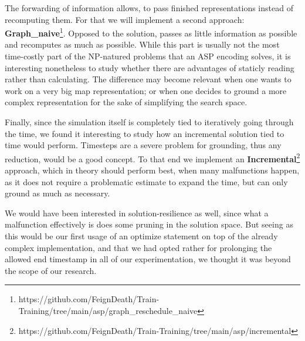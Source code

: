 The forwarding of information allows, to pass finished representations instead of recomputing them. For that we will implement a second approach: \textbf{Graph\_naive}\footnote{https://github.com/FeignDeath/Train-Training/tree/main/asp/graph\_reschedule\_naive}. Opposed to the solution, passes as little information as possible and recomputes as much as possible. While this part is usually not the most time-costly part of the NP-natured problems that an ASP encoding solves, it is interesting nonetheless to study whether there are advantages of staticly reading rather than calculating. The difference may become relevant when one wants to work on a very big map representation; or when one decides to ground a more complex representation for the sake of simplifying the search space.


Finally, since the simulation itself is completely tied to iteratively going through the time, we found it interesting to study how an incremental solution tied to time would perform. Timesteps are a severe problem for grounding, thus any reduction, would be a good concept. To that end we implement an \textbf{Incremental}\footnote{https://github.com/FeignDeath/Train-Training/tree/main/asp/incremental} approach, which in theory should perform best, when many malfunctions happen, as it does not require a problematic estimate to expand the time, but can only ground as much as necessary.


We would have been interested in solution-resilience as well, since what a malfunction effectively is does some pruning in the solution space. But seeing as this would be our first usage of an optimize statement on top of the already complex implementation, and that we had opted rather for prolonging the allowed end timestamp in all of our experimentation, we thought it was beyond the scope of our research.



